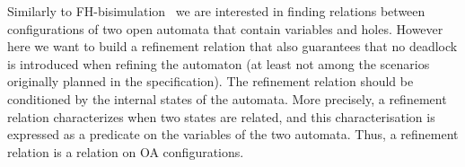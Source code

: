 \documentclass[runningheads]{llncs}
\begin{document}
Similarly to FH-bisimulation~\cite{fhbisim} we are interested  in finding relations between configurations of two open automata that contain variables and holes. However here we want to build a refinement relation that  also guarantees that no deadlock is introduced when refining the automaton (at least not among the scenarios originally planned in the specification).
The refinement relation should be conditioned by the internal states of the automata. More precisely, a refinement relation characterizes when two states are related, and this  characterisation is expressed as a predicate on the variables of the two automata.
Thus, a refinement relation is a relation on OA configurations.


%

\end{document}
